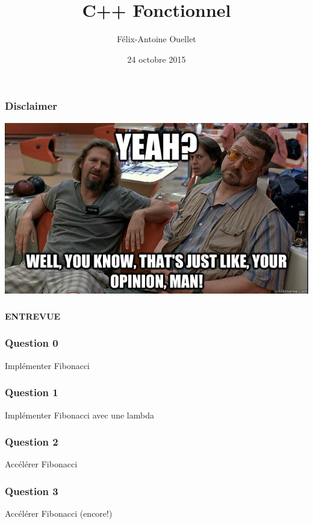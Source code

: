 \documentclass{beamer}
\author[Félix-Antoine Ouellet]{Félix-Antoine Ouellet}
\title[Functional\hspace{2em}\insertframenumber/\inserttotalframenumber]{C++ Fonctionnel}
\date{24 octobre 2015}
\begin{document}
\begin{frame}
\titlepage %
\end{frame}

\begin{frame}
\frametitle{Disclaimer}
\begin{center}
\includegraphics[scale=0.49]{dude.jpg}
\end{center}
\end{frame}

\begin{frame}
\frametitle{}
\begin{center}
\Huge{\textbf{ENTREVUE}}
\end{center}
\end{frame}

\begin{frame}
\frametitle{Question 0}
\begin{center}
\Huge{Implémenter Fibonacci}
\end{center}
\end{frame}

\begin{frame}
\frametitle{Question 1}
\begin{center}
\Huge{Implémenter Fibonacci avec une lambda}
\end{center}
\end{frame}

\begin{frame}
\frametitle{Question 2}
\begin{center}
\Huge{Accélérer Fibonacci}
\end{center}
\end{frame}

\begin{frame}
\frametitle{Question 3}
\begin{center}
\Huge{Accélérer Fibonacci (encore!)}
\end{center}
\end{frame}
\end{document}
